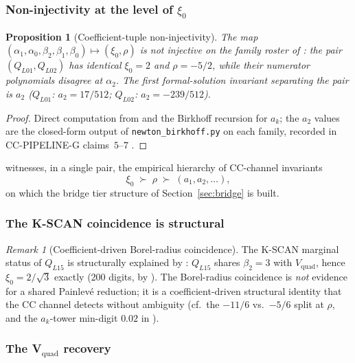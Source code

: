 \documentclass[11pt,reqno]{amsart}
\theoremstyle{plain}
\newtheorem{proposition}[theorem]{Proposition}
\theoremstyle{definition}
\theoremstyle{remark}
\newtheorem{remark}[theorem]{Remark}
\newcommand{\CC}{\mathrm{CC}}
\newcommand{\Vquad}{V_{\mathrm{quad}}}
\begin{document}
\subsubsection*{Non-injectivity at the level of $\xi_0$}

\begin{proposition}[Coefficient-tuple non-injectivity]
\label{prop:noninj}
The map
$(\alpha_1, \alpha_0, \beta_2, \beta_1, \beta_0)
\longmapsto (\xi_0, \rho)$
is not injective on the family roster of
: the pair $(Q_{L01}, Q_{L02})$ has
\emph{identical} $\xi_0 = 2$ and $\rho = -5/2$, while their
numerator polynomials disagree at $\alpha_2$. The first
formal-solution invariant separating the pair is $a_2$
($Q_{L01}$: $a_2 = 17/512$; $Q_{L02}$: $a_2 = -239/512$).
\end{proposition}

\begin{proof}
Direct computation from  and the Birkhoff
recursion for $a_k$; the $a_2$ values are the closed-form
output of \texttt{newton\_birkhoff.py} on each family,
recorded in CC-PIPELINE-G claims~$5$--$7$
\cite{siarc_cc_pipeline_g}.
\end{proof}

 witnesses, in a single pair, the empirical
hierarchy of $\CC$-channel invariants
\[
  \xi_0 \;\succ\; \rho \;\succ\; (a_1, a_2, \ldots),
\]
on which the bridge tier structure of
Section~\ref{sec:bridge} is built.

\subsubsection*{The K-SCAN coincidence is structural}

\begin{remark}[Coefficient-driven Borel-radius coincidence]
\label{rem:kscan}
The K-SCAN marginal status of $Q_{L15}$
\cite{siarc_borel_kscan} is structurally explained by
: $Q_{L15}$ shares $\beta_2 = 3$ with $\Vquad$,
hence $\xi_0 = 2/\sqrt 3$ exactly (200 digits, by
). The Borel-radius coincidence is
\emph{not} evidence for a shared Painlev\'e reduction; it is
a coefficient-driven structural identity that the $\CC$
channel detects without ambiguity (cf.\ the $-11/6$ vs.\
$-5/6$ split at $\rho$, and the $a_k$-tower min-digit
$0.02$ in ).
\end{remark}

\subsubsection*{The V$_\mathrm{quad}$ recovery}
\end{document}
